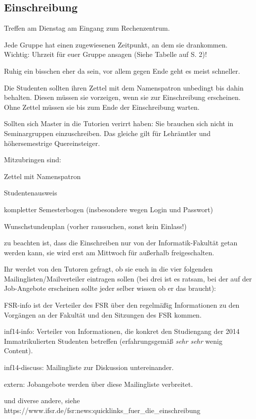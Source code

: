 \documentclass[a4paper,12pt]{report}
\begin{document}
\subsection{Einschreibung}
\begin{itemize*}
	\item Treffen am Dienstag am Eingang zum Rechenzentrum.
	\item Jede Gruppe hat einen zugewiesenen Zeitpunkt, an dem sie drankommen. Wichtig: Uhrzeit für euer Gruppe ansagen (Siehe Tabelle auf S. 2)!
	\item Ruhig ein bisschen eher da sein, vor allem gegen Ende geht es meist schneller.
	\item Die Studenten sollten ihren Zettel mit dem Namenspatron unbedingt bis dahin behalten. Diesen müssen sie vorzeigen, wenn sie zur Einschreibung erscheinen. Ohne Zettel müssen sie bis zum Ende der Einschreibung warten.
	\item Sollten sich Master in die Tutorien verirrt haben: Sie brauchen sich nicht in Seminargruppen einzuschreiben. Das gleiche gilt für Lehrämtler und höhersemestrige Quereinsteiger.
	\item Mitzubringen sind:
		\begin{itemize*}
		\item Zettel mit Namenspatron
		\item Studentenausweis
		\item kompletter Semesterbogen (insbesondere wegen Login und Passwort)
		\item Wunschstundenplan (vorher raussuchen, sonst kein Einlass!)
		\item zu beachten ist, dass die Einschreiben nur von der Informatik-Fakultät getan werden kann, sie wird erst am Mittwoch für außerhalb freigeschalten.
	\end{itemize*}
	\item Ihr werdet von den Tutoren gefragt, ob sie euch in die vier folgenden Mailinglisten/Mailverteiler eintragen sollen (bei drei ist es ratsam, bei der auf der Job-Angebote erscheinen sollte jeder selber wissen ob er das braucht):
		\begin{itemize*}
		\item FSR-info ist der Verteiler des FSR über den regelmäßig Informationen zu den Vorgängen an der Fakultät und den Sitzungen des FSR kommen.
		\item inf14-info: Verteiler von Informationen, die konkret den Studiengang der 2014 Immatrikulierten Studenten betreffen (erfahrungsgemäß \textit{sehr sehr} wenig Content).
		\item inf14-discuss: Mailingliste zur Diskussion untereinander.
		\item extern: Jobangebote werden über diese Mailingliste verbreitet.
		\item und diverse andere, siehe \\ https://www.ifsr.de/fsr:news:quicklinks\_fuer\_die\_einschreibung
	\end{itemize*}
\end{itemize*}
\end{document}
